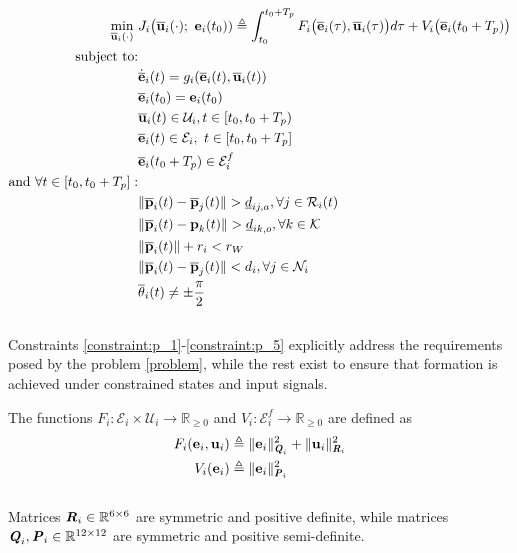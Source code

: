 \begin{align}
  \min\limits_{\overline{\bm{\mathbf{u}}}_i (\cdot)}\ &
    J_i \big(\overline{\bm{\mathbf{u}}}_i (\cdot);\ \bm{\mathbf{e}}_i(t_0)) \triangleq
      \int_{t_0}^{t_0 + T_p} F_i \big(\overline{\bm{\mathbf{e}}}_i(\tau), \overline{\bm{\mathbf{u}}}_i (\tau)\big) d \tau +
      V_i \big(\overline{\bm{\mathbf{e}}}_i (t_0 + T_p)\big) \label{position_based_cost} \\
  \text{subject to:} & \nonumber \\
  & \dot{\overline{\bm{\mathbf{e}}}}_i(t) = g_i (\overline{\bm{\mathbf{e}}}_i (t), \overline{\bm{\mathbf{u}}}_i (t)) \\
  & \overline{\bm{\mathbf{e}}}_i (t_0) = \bm{\mathbf{e}}_i (t_0) \\
  & \overline{\bm{\mathbf{u}}}_i(t) \in \mathcal{U}_i, t \in [t_0, t_0 + T_p)\\
  & \overline{\bm{\mathbf{e}}}_i (t) \in \mathcal{E}_i,\ t \in [t_0, t_0 + T_p]\\
  & \overline{\bm{\mathbf{e}}}_i (t_0 + T_p) \in \mathcal{E}_i^f \\
  \text{and } \forall t \in [t_0, t_0 + T_p]:& \nonumber \\
  & \|\overline{\bm{\mathbf{p}}}_i(t) - \overline{\bm{\mathbf{p}}}_j(t)\| > \underline{d}_{ij,a}, \forall j \in \mathcal{R}_i(t) \label{constraint:p_1}\\
  & \|\overline{\bm{\mathbf{p}}}_i(t) - \bm{\mathbf{p}}_k(t)\| > \underline{d}_{ik,o}, \forall k \in \mathcal{K} \\
  & \|\overline{\bm{\mathbf{p}}}_i(t)\| + r_i < r_W \\
  & \|\overline{\bm{\mathbf{p}}}_i(t) - \overline{\bm{\mathbf{p}}}_j(t)\| < d_i, \forall j \in \mathcal{N}_i \\
  & \overline{\theta}_i(t) \ne \pm \frac{\pi}{2} \label{constraint:p_5}
\end{align}\\
Constraints \ref{constraint:p_1}-\ref{constraint:p_5} explicitly address the
requirements posed by the problem \eqref{problem}, while the rest exist to
ensure that formation is achieved under constrained states and input signals.

The functions
$F_i : \mathcal{E}_i \times \mathcal{U}_i \to \mathbb{R}_{\geq 0}$ and
$V_i: \mathcal{E}_i^f \to \mathbb{R}_{\geq 0}$ are defined as
\begin{align}
  F_i (\bm{\mathbf{e}}_i, \bm{\mathbf{u}}_i)
    &\triangleq \| \bm{\mathbf{e}}_i\|_{\bm{\mathit{Q}}_i}^2 + \| \bm{\mathbf{u}}_i\|_{\bm{\mathit{R}}_i}^2 \\
  V_i (\bm{\mathbf{e}}_i)
    & \triangleq \| \bm{\mathbf{e}}_i \|_{\bm{\mathit{P}}_i}^2
\end{align}\\
Matrices $\bm{\mathit{R}}_i \in \mathbb{R}^{6 \times 6}$ are symmetric and positive
definite, while matrices $\bm{\mathit{Q}}_i, \bm{\mathit{P}}_i \in \mathbb{R}^{12 \times 12}$
are symmetric and positive semi-definite.

